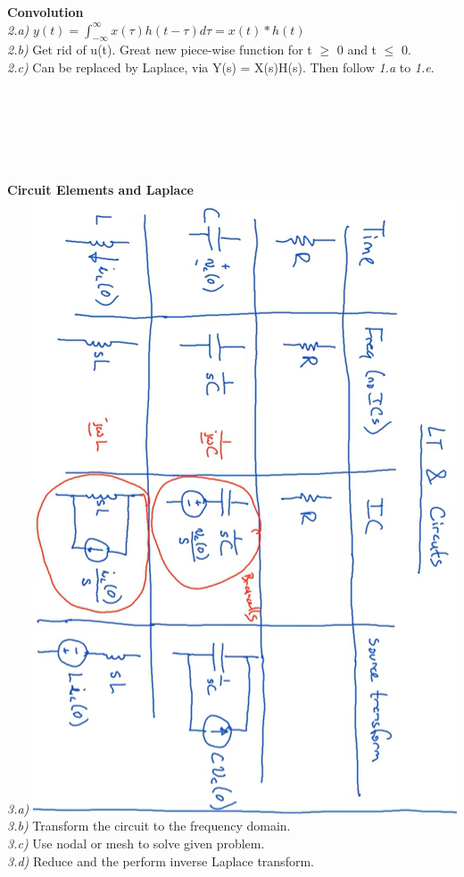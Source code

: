 \documentclass[10pt]{book}
\begin{document}
\begin{tcbposter}[
  poster = {%
    columns=3,
    rows=1,
    spacing=1mm,
  },
]
{	\textbf{Convolution}\\
\textit{2.a)} $y(t)= \int_{-\infty}^{\infty} x(\tau)h(t-\tau)d\tau = x(t) * h(t)$ \\
\textit{2.b)} Get rid of u(t). Great new piece-wise function for t $\geqslant$ 0 and t 
$\leqslant$ 0.\\
\textit{2.c)} Can be replaced by Laplace, via Y(s) = X(s)H(s). Then follow 
\textit{1.a} to \textit{1.e}.\\
\\
\\
\\
\\
\\
\\
	\textbf{Circuit Elements and Laplace} \\
\textit{3.a) }\includegraphics[scale=0.36]{note2.png}\\
\textit{3.b) } Transform the circuit to the frequency domain.\\
\textit{3.c) } Use nodal or mesh to solve given problem.\\
\textit{3.d) } Reduce and the perform inverse Laplace transform.\\



  


   }
\end{tcbposter}
\end{document}
